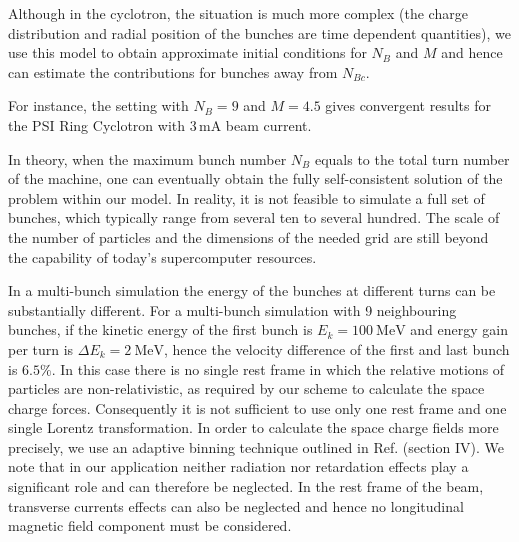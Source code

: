 \documentclass[aps,prstab,onecolumn,superscriptaddress,showpacs]{revtex4}
\begin{document}
Although in the cyclotron, the situation is much more complex (the charge distribution and radial position of the bunches are time dependent quantities), we use this model to obtain approximate initial conditions for $N_B$ and $M$ and hence can estimate the contributions for bunches away from $N_{Bc}$.

For instance, the setting with $N_B=9$ and  $M=4.5$ gives convergent results for the PSI Ring Cyclotron with 3\,mA beam current.

In theory, when the maximum bunch number $N_B$ equals to the total turn number of the machine, one can eventually obtain the fully self-consistent solution of the problem within our model. 
In reality, it is not feasible  to simulate a full set of bunches, which typically range from 
several ten to several hundred.
The scale of the number of particles and the dimensions of the needed grid are still beyond the capability of today's supercomputer resources.


In a multi-bunch simulation the energy of the bunches at different turns can be substantially  different. 
For a multi-bunch simulation with 9 neighbouring bunches, if the kinetic energy of the first bunch is $E_k=100~\text{MeV}$ and energy gain per turn is $\Delta E_k=2~\text{MeV}$, hence
the velocity difference of the first and last bunch is $6.5\%$.  
In this case there is no single rest frame in which the relative motions of 
particles are non-relativistic, as required by our scheme to calculate the space charge forces. Consequently it is not sufficient to use only one rest frame 
and one single Lorentz transformation. In order to calculate the space charge fields more precisely, 
we use an adaptive binning technique outlined in Ref. \cite{Fubiani:2006p305} (section IV). 
We note that in our application neither radiation nor retardation effects play a significant role and can therefore be neglected. 
In the rest frame of the beam, transverse currents effects can also be neglected and hence no longitudinal magnetic field component must be considered.
\end{document}
